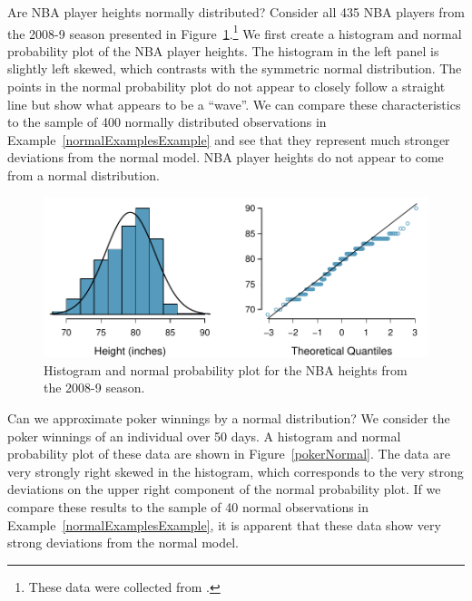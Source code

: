 \textC{\pagebreak}

\begin{example}{Are NBA player heights normally distributed? Consider all 435 NBA players from the 2008-9 season presented in Figure~\ref{nbaNormal}.\footnote{These data were collected from .}}
We first create a histogram and normal probability plot of the NBA player heights. The histogram in the left panel is slightly left skewed, which contrasts with the symmetric normal distribution. The points in the normal probability plot do not appear to closely follow a straight line but show what appears to be a ``wave''. We can compare these characteristics to the sample of 400 normally distributed observations in Example~\ref{normalExamplesExample} and see that they represent much stronger deviations from the normal model. NBA player heights do not appear to come from a normal distribution.
\end{example}

\begin{figure}
\centering
\includegraphics[width=\textwidth]{ch_distributions/figures/nbaNormal/nbaNormal}
\caption{Histogram and normal probability plot for the NBA heights from the 2008-9 season.}
\label{nbaNormal}
\end{figure}

\begin{example}{Can we approximate poker winnings by a normal distribution? We consider the poker winnings of an individual over 50 days. A histogram and normal probability plot of these data are shown in Figure~\ref{pokerNormal}.}
The data are very strongly right skewed in the histogram, which corresponds to the very strong deviations on the upper right component of the normal probability plot. If we compare these results to the sample of 40 normal observations in Example~\ref{normalExamplesExample}, it is apparent that these data show very strong deviations from the normal model.
\end{example}

